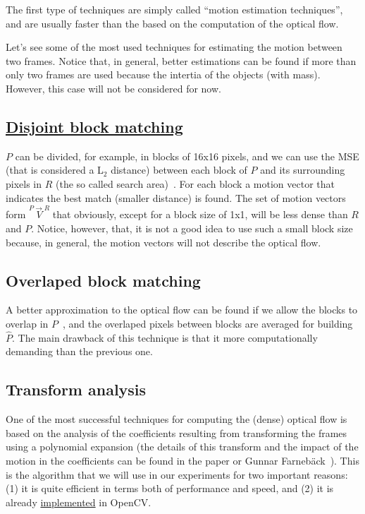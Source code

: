 The first type of techniques are simply called ``motion estimation
techniques'', and are usually faster than the based on the computation
of the optical flow.


Let's see some of the most used techniques for estimating the motion
between two frames. Notice that, in general, better estimations can be
found if more than only two frames are used because the intertia of
the objects (with mass). However, this case will not be considered for
now.

\subsection{\href{https://vicente-gonzalez-ruiz.github.io/video_compression/\#x1-40003}{Disjoint block matching}}
$P$ can be divided, for example, in blocks of 16x16 pixels, and we can
use the MSE (that is considered a L$_2$ distance) between each block
of $P$ and its surrounding pixels in $R$ (the so called search
area)~\cite{zhu2000new}. For each block a motion vector that indicates
the best match (smaller distance) is found. The set of motion vectors
form $\overset{P\rightarrow R}{V}$ that obviously, except for a block
size of 1x1, will be less dense than $R$ and $P$. Notice, however,
that, it is not a good idea to use such a small block size because, in
general, the motion vectors will not describe the optical flow.

\subsection{Overlaped block matching}
A better approximation to the optical flow can be found if we allow
the blocks to overlap in $P$~\cite{orchard1994overlapped}, and the
overlaped pixels between blocks are averaged for building
$\hat{P}$. The main drawback of this technique is that it more
computationally demanding than the previous one.

\subsection{Transform analysis}
One of the most successful techniques for computing the (dense)
optical flow is based on the analysis of the coefficients resulting
from transforming the frames using a polynomial expansion (the details
of this transform and the impact of the motion in the coefficients can
be found in the paper or Gunnar
Farneb{\"a}ck~\cite{farneback2003two}). This is the algorithm that we
will use in our experiments for two important reasons: (1) it is quite
efficient in terms both of performance and speed, and (2) it is
already
\href{https://docs.opencv.org/3.4/d4/dee/tutorial_optical_flow.html}{implemented}
in OpenCV.

